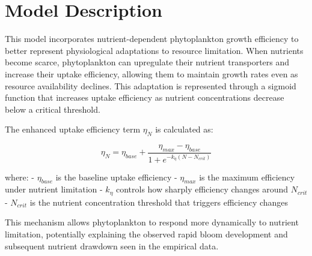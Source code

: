 \section{Model Description}

This model incorporates nutrient-dependent phytoplankton growth efficiency to better represent physiological adaptations to resource limitation. When nutrients become scarce, phytoplankton can upregulate their nutrient transporters and increase their uptake efficiency, allowing them to maintain growth rates even as resource availability declines. This adaptation is represented through a sigmoid function that increases uptake efficiency as nutrient concentrations decrease below a critical threshold.

The enhanced uptake efficiency term $\eta_N$ is calculated as:

\[ \eta_N = \eta_{base} + \frac{\eta_{max} - \eta_{base}}{1 + e^{-k_{\eta}(N - N_{crit})}} \]

where:
- $\eta_{base}$ is the baseline uptake efficiency
- $\eta_{max}$ is the maximum efficiency under nutrient limitation
- $k_{\eta}$ controls how sharply efficiency changes around $N_{crit}$
- $N_{crit}$ is the nutrient concentration threshold that triggers efficiency changes

This mechanism allows phytoplankton to respond more dynamically to nutrient limitation, potentially explaining the observed rapid bloom development and subsequent nutrient drawdown seen in the empirical data.
